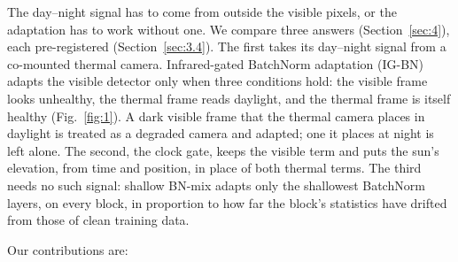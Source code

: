 \documentclass[journal]{IEEEtran}
\begin{document}
The day--night signal has to come from outside the visible pixels, or the adaptation has to work without one. We compare three answers (Section~\ref{sec:4}), each pre-registered (Section~\ref{sec:3.4}). The first takes its day--night signal from a co-mounted thermal camera. Infrared-gated BatchNorm adaptation (\mbox{IG-BN}) adapts the visible detector only when three conditions hold: the visible frame looks unhealthy, the thermal frame reads daylight, and the thermal frame is itself healthy (Fig.~\ref{fig:1}). A dark visible frame that the thermal camera places in daylight is treated as a degraded camera and adapted; one it places at night is left alone. The second, the clock gate, keeps the visible term and puts the sun's elevation, from time and position, in place of both thermal terms. The third needs no such signal: shallow BN-mix adapts only the shallowest BatchNorm layers, on every block, in proportion to how far the block's statistics have drifted from those of clean training data.

Our contributions are:
\end{document}
